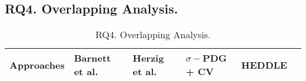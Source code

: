 \subsection{{\bf RQ4. Overlapping Analysis.}}

\begin{table}[t]
	\caption{RQ4. Overlapping Analysis.}
	\vspace{-0.1in}
	\begin{center}
		\footnotesize
		\tabcolsep 4pt
		\renewcommand{\arraystretch}{1} \begin{tabular}{p{1.4cm}<{\centering}|p{1.3cm}<{\centering}p{1.2cm}<{\centering}p{1.4cm}<{\centering}p{0.8cm}<{\centering}|p{0.7cm}<{\centering}}
			
			\hline
			Approaches          & Barnett et al. & Herzig et al. & $\sigma-$PDG + CV& HEDDLE & \tool\\
			\hline
			\hline
		\end{tabular}
		\label{RQ4-result}
	\end{center}
\end{table}